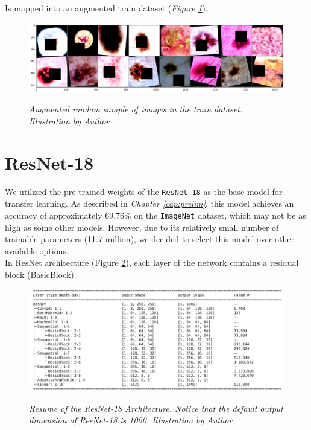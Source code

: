 Is mapped into an augmented train dataset (\textit{Figure \ref{fig:aug-sample-of-datasets}}).

\begin{figure}[H]
  \centering
  \includegraphics[width=\textwidth]{imatges/methodological_contribution/random-sample-of-isic-augmented.png}
  \caption[Augmented random sample of images in the train dataset]{\textit{Augmented random sample of images in the train dataset. Illustration by Author}}
  {\label{fig:aug-sample-of-datasets}}
\end{figure}

\newpage

\section{ResNet-18}

We utilized the pre-trained weights of the {\tt ResNet-18} as the base model for transfer learning. As described in \textit{Chapter \ref{cap:prelim}}, this model achieves an accuracy of approximately 69.76\% on the {\tt ImageNet} dataset, which may not be as high as some other models. However, due to its relatively small number of trainable parameters (11.7 million), we decided to select this model over other available options. \\

In ResNet architecture (Figure \ref{fig:resnet-18-arch}), each layer of the network contains a residual block (BasicBlock).

\begin{figure}[H]
  \begin{adjustbox}{width=\textwidth, trim={0.2cm 0pt 1.5cm 0pt}, clip}
    \centering
    \includegraphics[width=\textwidth]{imatges/methodological_contribution/residual-blocks.png}
  \end{adjustbox}
  \caption[Resume of the ResNet-18 Architecture]{\textit{Resume of the ResNet-18 Architecture. Notice that the default output dimension of ResNet-18 is 1000. Illustration by Author}}
  {\label{fig:resnet-18-arch}}
\end{figure}

